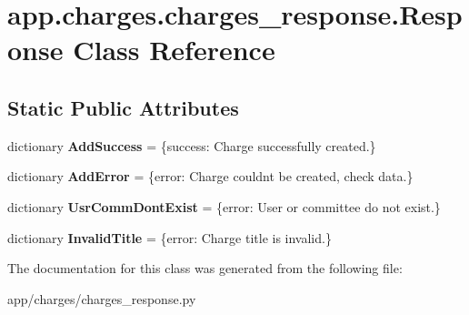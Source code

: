 \hypertarget{classapp_1_1charges_1_1charges__response_1_1_response}{}\section{app.\+charges.\+charges\+\_\+response.\+Response Class Reference}
\label{classapp_1_1charges_1_1charges__response_1_1_response}
\subsection*{Static Public Attributes}
\begin{DoxyCompactItemize}
\item 
\mbox{\label{classapp_1_1charges_1_1charges__response_1_1_response_ae708585dedaf0497ce59df9214848e0a}} 
dictionary {\bfseries Add\+Success} = \{\textquotesingle{}success\textquotesingle{}\+: \textquotesingle{}Charge successfully created.\textquotesingle{}\}
\item 
\mbox{\label{classapp_1_1charges_1_1charges__response_1_1_response_abb9e7eaf84f932f24eec4e680484fd61}} 
dictionary {\bfseries Add\+Error} = \{\textquotesingle{}error\textquotesingle{}\+: \textquotesingle{}Charge couldnt be created, check data.\textquotesingle{}\}
\item 
\mbox{\label{classapp_1_1charges_1_1charges__response_1_1_response_a444eac48e44fdf43af7df527fd90923b}} 
dictionary {\bfseries Usr\+Comm\+Dont\+Exist} = \{\textquotesingle{}error\textquotesingle{}\+: \textquotesingle{}User or committee do not exist.\textquotesingle{}\}
\item 
\mbox{\label{classapp_1_1charges_1_1charges__response_1_1_response_a1f891ae345085522a2e8bf79e71c923e}} 
dictionary {\bfseries Invalid\+Title} = \{\textquotesingle{}error\textquotesingle{}\+: \textquotesingle{}Charge title is invalid.\textquotesingle{}\}
\end{DoxyCompactItemize}


The documentation for this class was generated from the following file\+:\begin{DoxyCompactItemize}
\item 
app/charges/charges\+\_\+response.\+py\end{DoxyCompactItemize}
